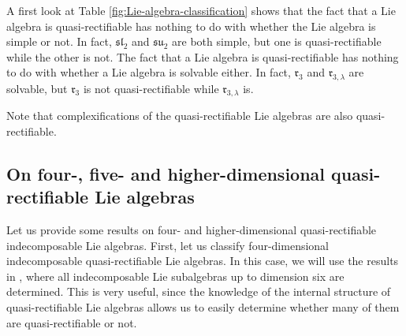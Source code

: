 \documentclass[12pt]{article}
\theoremstyle{plain}
\theoremstyle{definition}
\numberwithin{equation}{section}
\begin{document}
A first look at Table \ref{fig:Lie-algebra-classification} shows that the fact that a Lie algebra is quasi-rectifiable has nothing to do with whether the Lie algebra is simple or not. In fact, $\mathfrak{sl}_2$ and $\mathfrak{su}_2$ are both simple, but one is quasi-rectifiable while the other is not. The fact that a Lie algebra is quasi-rectifiable has nothing to do with whether a Lie algebra is solvable either. In fact, $\mathfrak{r}_3$ and $\mathfrak{r}_{3,\lambda}$ are solvable, but $\mathfrak{r}_3$ is not quasi-rectifiable while $\mathfrak{r}_{3,\lambda}$ is. 

Note that complexifications of the quasi-rectifiable Lie algebras are also quasi-rectifiable.

\subsection{On four-, five- and higher-dimensional quasi-rectifiable Lie algebras}
Let us provide some results on four- and higher-dimensional quasi-rectifiable indecomposable Lie algebras.   First, let us classify four-dimensional indecomposable quasi-rectifiable Lie algebras. In this case, we will use the results in \cite{PW77}, where all  indecomposable Lie subalgebras up to dimension six are determined. This is very useful, since the knowledge of the internal structure of quasi-rectifiable Lie algebras allows us to easily determine whether many of them are quasi-rectifiable or not. 
\end{document}
